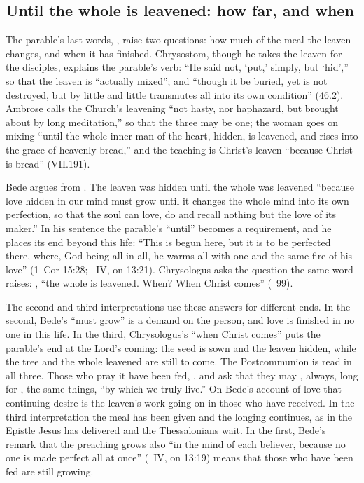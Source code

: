 \subsection{Until the whole is leavened: how far, and when}

The parable's last words, , raise two
questions: how much of the meal the leaven changes, and when it has finished.
Chrysostom, though he takes the leaven for the disciples, explains the
parable's verb: ``He said not, `put,' simply, but `hid','' so that the leaven
is ``actually mixed''; and ``though it be buried, yet is not destroyed, but by
little and little transmutes all into its own condition'' (46.2). Ambrose calls
the Church's leavening ``not hasty, nor haphazard, but brought about by long
meditation,'' so that the three may be one; the woman goes on mixing ``until
the whole inner man of the heart, hidden, is leavened, and rises into the
grace of heavenly bread,'' and the teaching is Christ's leaven ``because Christ
is bread'' (VII.191).

Bede argues from . The leaven was hidden until the whole was
leavened ``because love hidden in our mind must grow until it changes the
whole mind into its own perfection, so that the soul can love, do and recall
nothing but the love of its maker.'' In his sentence the parable's ``until''
becomes a requirement, and he places its end beyond this life: ``This is
begun here, but it is to be perfected there, where, God being all in all, he
warms all with one and the same fire of his love'' (1~Cor 15:28; ~IV, on 13:21). Chrysologus asks the question the same word raises:
, ``the whole is
leavened. When? When Christ comes'' (~99).

The second and third interpretations use these answers for different ends. In
the second, Bede's ``must grow'' is a demand on the person, and love is
finished in no one in this life. In the third, Chrysologus's ``when Christ
comes'' puts the parable's end at the Lord's coming: the seed is sown and the
leaven hidden, while the tree and the whole leavened are still to come. The
Postcommunion is read in all three. Those who pray it have been fed,
, and ask that they may , always, long for
, the same things, ``by which we truly live.'' On Bede's account
of love that continuing desire is the leaven's work going on in those who
have received. In the third interpretation the meal has been given and the
longing continues, as in the Epistle Jesus has delivered and the
Thessalonians wait. In the first, Bede's remark that the preaching grows also
``in the mind of each believer, because no one is made perfect all at once''
(~IV, on 13:19) means that those who have been fed are still
growing.

